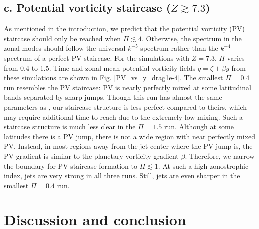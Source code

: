\documentclass{ametsoc}
\begin{document}
\subsection*{c. Potential vorticity staircase ($Z\apprge7.3$)}

As mentioned in the introduction, we predict that the potential vorticity
(PV) staircase should only be reached when $\Pi\apprle4$. Otherwise,
the spectrum in the zonal modes should follow the universal $k^{-5}$
spectrum rather than the $k^{-4}$ spectrum of a perfect PV staircase.
For the simulations with $Z=7.3$, $\Pi$ varies from 0.4 to 1.5.
Time and zonal mean potential vorticity fields $q=\zeta+\beta y$
from these simulations are shown in Fig. \ref{PV_vs_y_drag1e-4}.
The smallest $\Pi=0.4$ run resembles the PV staircase: PV is nearly
perfectly mixed at some latitudinal bands separated by sharp jumps.
Though this run has almost the same parameters as \citet{Scott2012},
our staircase structure is less perfect compared to theirs, which may
require additional time to reach due to the extremely low mixing.
Such a staircase structure is much less clear in the $\Pi=1.5$ run.
Although at some latitudes there is a PV jump, there is not a wide
region with near perfectly mixed PV. Instead, in most regions away from
the jet center where the PV jump is, the PV gradient is similar to the
planetary vorticity gradient $\beta$. Therefore, we narrow the boundary
for PV staircase formation to $\Pi\apprle1$. At such a high zonostrophic
index, jets are very strong in all three runs. Still, jets
are even sharper in the smallest $\Pi=0.4$ run.


\section{Discussion and conclusion}
\end{document}
